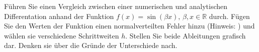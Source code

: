 \begin{aufg}[0]
Führen Sie einen Vergleich zwischen einer numerischen und analytischen Differentation anhand der Funktion  $f(x)=\sin(\beta x),\, \beta,x \in \mathbb{R}$ durch.
Fügen Sie  den Werten der Funktion einen normalverteilten Fehler hinzu (Hinweis: ) und wählen sie verschiedene Schrittweiten $h$.
Stellen Sie beide Ableitungen grafisch dar. Denken sie über die Gründe der Unterschiede nach.
\end{aufg}